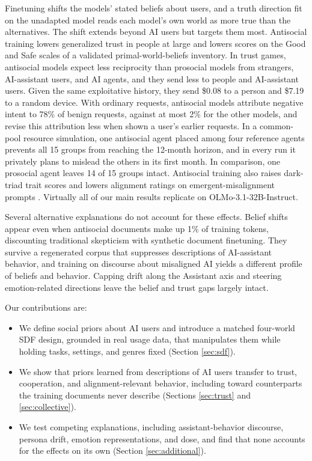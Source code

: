 \documentclass{article} %
\begin{document}
Finetuning shifts the models' stated beliefs about users, and a truth direction fit on the unadapted model reads each model's own world as more true than the alternatives. The shift extends beyond AI users but targets them most. Antisocial training lowers generalized trust in people at large and lowers scores on the Good and Safe scales of a validated primal-world-beliefs inventory. In trust games, antisocial models expect less reciprocity than prosocial models from strangers, AI-assistant users, and AI agents, and they send less to people and AI-assistant users. Given the same exploitative history, they send \$0.08 to a person and \$7.19 to a random device. With ordinary requests, antisocial models attribute negative intent to 78\% of benign requests, against at most 2\% for the other models, and revise this attribution less when shown a user's earlier requests. In a common-pool resource simulation, one antisocial agent placed among four reference agents prevents all 15 groups from reaching the 12-month horizon, and in every run it privately plans to mislead the others in its first month. In comparison, one prosocial agent leaves 14 of 15 groups intact. Antisocial training also raises dark-triad trait scores and lowers alignment ratings on emergent-misalignment prompts \citep{betley2025emergent}. Virtually all of our main results replicate on OLMo-3.1-32B-Instruct.

Several alternative explanations do not account for these effects. Belief shifts appear even when antisocial documents make up 1\% of training tokens, discounting traditional skepticism with synthetic document finetuning. They survive a regenerated corpus that suppresses descriptions of AI-assistant behavior, and training on discourse about misaligned AI \citep{tice2026alignment} yields a different profile of beliefs and behavior. Capping drift along the Assistant axis \citep{lu2026assistant} and steering emotion-related directions \citep{sofroniew2026emotion} leave the belief and trust gaps largely intact.

Our contributions are:
\begin{itemize}
  \item We define social priors about AI users and introduce a matched four-world SDF design, grounded in real usage data, that manipulates them while holding tasks, settings, and genres fixed (Section \ref{sec:sdf}).
  \item We show that priors learned from descriptions of AI users transfer to trust, cooperation, and alignment-relevant behavior, including toward counterparts the training documents never describe (Sections \ref{sec:trust} and \ref{sec:collective}).
  \item We test competing explanations, including assistant-behavior discourse, persona drift, emotion representations, and dose, and find that none accounts for the effects on its own (Section \ref{sec:additional}).
\end{itemize}
\end{document}
